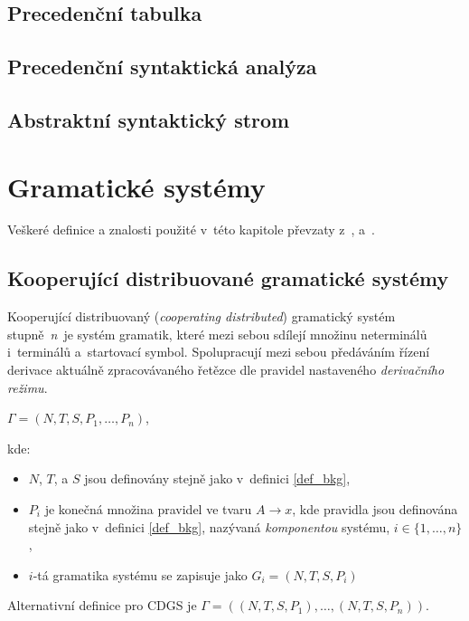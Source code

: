 \section{Precedenční tabulka}

\section{Precedenční syntaktická analýza}

\section{Abstraktní syntaktický strom}


\chapter{Gramatické systémy}\label{kap_GS}

Veškeré definice a znalosti použité v~této kapitole převzaty z~\cite{CDGS}, \cite{PCGS} a~\cite{Handbook-Of-Formal-Languages-2}.

\section{Kooperující distribuované gramatické systémy}\label{kap_CDGS}

Kooperující distribuovaný (\emph{cooperating distributed}) gramatický systém stupně~\emph{n}~je systém gramatik, které mezi sebou sdílejí množinu neterminálů i~terminálů a~startovací symbol.
Spolupracují mezi sebou předáváním řízení derivace aktuálně zpracovávaného řetězce dle pravidel nastaveného \emph{derivačního režimu}.

\begin{definition}\label{def_cdgs}
\begin{center}
    $\Gamma = (N, T, S, P_1, \ldots ,P_n)$,
\end{center}
kde:
\begin{itemize}
    \item $N$, $T$, a $S$ jsou definovány stejně jako v~definici \ref{def_bkg},
    \item $P_i$ je konečná množina pravidel ve tvaru $A\rightarrow x$, kde pravidla jsou definována stejně jako v~definici \ref{def_bkg}, nazývaná \emph{komponentou} systému, $i \in \{1, \ldots, n\}$,
    \item $i$-tá gramatika systému se zapisuje jako $G_i = (N,T,S,P_i)$
\end{itemize}   
Alternativní definice pro CDGS je $\Gamma = ((N, T, S, P_1), \ldots , (N, T, S, P_n))$.
\end{definition}

